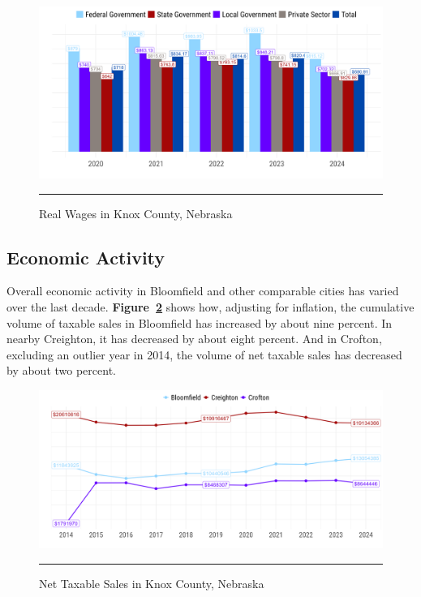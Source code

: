 \begin{figure}[H]
\centering
\begin{framed}
    \caption{Real Wages in Knox County, Nebraska}
    \label{fig:wages}
    \includegraphics[width=\linewidth]{figures/avg_weekly_wage.png}
    \rule[-5pt]{\linewidth}{0.4pt}
\end{framed}
\end{figure}

\subsection{Economic Activity}

\noindent Overall economic activity in Bloomfield and other comparable cities has varied over the last decade. \textbf{Figure~\ref{fig:netTaxableSales}} shows how, adjusting for inflation, the cumulative volume of taxable sales in Bloomfield has increased by about nine percent. In nearby Creighton, it has decreased by about eight percent. And in Crofton, excluding an outlier year in 2014, the volume of net taxable sales has decreased by about two percent.

\begin{figure}[H]
\centering
\begin{framed}
    \caption{Net Taxable Sales in Knox County, Nebraska}
    \label{fig:netTaxableSales}
    \includegraphics[width=\linewidth]{figures/net_taxable_sales.png}
    \rule[-5pt]{\linewidth}{0.4pt}
\end{framed}
\end{figure}

